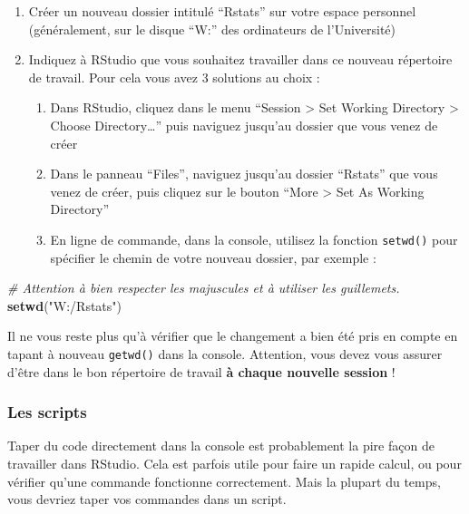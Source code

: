 \documentclass[a4paperpaper,]{article}
\newenvironment{Shaded}{\begin{snugshade}}{\end{snugshade}}
\newcommand{\KeywordTok}[1]{\textcolor[rgb]{0.13,0.29,0.53}{\textbf{#1}}}
\newcommand{\StringTok}[1]{\textcolor[rgb]{0.31,0.60,0.02}{#1}}
\newcommand{\CommentTok}[1]{\textcolor[rgb]{0.56,0.35,0.01}{\textit{#1}}}
\newcommand{\NormalTok}[1]{#1}
\providecommand{\tightlist}{%
  \setlength{\itemsep}{0pt}\setlength{\parskip}{0pt}}
\theoremstyle{definition}
\theoremstyle{definition}
\theoremstyle{definition}
\theoremstyle{remark}
\begin{document}
\begin{enumerate}
\def\labelenumi{\arabic{enumi}.}
\tightlist
\item
  Créer un nouveau dossier intitulé ``Rstats'' sur votre espace
  personnel (généralement, sur le disque ``W:'' des ordinateurs de
  l'Université)
\item
  Indiquez à RStudio que vous souhaitez travailler dans ce nouveau
  répertoire de travail. Pour cela vous avez 3 solutions au choix :

  \begin{enumerate}
  \def\labelenumii{\arabic{enumii}.}
  \tightlist
  \item
    Dans RStudio, cliquez dans le menu ``Session \textgreater{} Set
    Working Directory \textgreater{} Choose Directory\ldots{}'' puis
    naviguez jusqu'au dossier que vous venez de créer
  \item
    Dans le panneau ``Files'', naviguez jusqu'au dossier ``Rstats'' que
    vous venez de créer, puis cliquez sur le bouton ``More
    \textgreater{} Set As Working Directory''
  \item
    En ligne de commande, dans la console, utilisez la fonction
    \texttt{setwd()} pour spécifier le chemin de votre nouveau dossier,
    par exemple :
  \end{enumerate}
\end{enumerate}

\begin{Shaded}
\begin{Highlighting}[]
\CommentTok{# Attention à bien respecter les majuscules et à utiliser les guillemets.}
\KeywordTok{setwd}\NormalTok{(}\StringTok{"W:/Rstats"}\NormalTok{)}
\end{Highlighting}
\end{Shaded}

Il ne vous reste plus qu'à vérifier que le changement a bien été pris en
compte en tapant à nouveau \texttt{getwd()} dans la console. Attention,
vous devez vous assurer d'être dans le bon répertoire de travail
\textbf{à chaque nouvelle session} !

\subsubsection{Les scripts}\label{les-scripts}

Taper du code directement dans la console est probablement la pire façon
de travailler dans RStudio. Cela est parfois utile pour faire un rapide
calcul, ou pour vérifier qu'une commande fonctionne correctement. Mais
la plupart du temps, vous devriez taper vos commandes dans un script.
\end{document}
